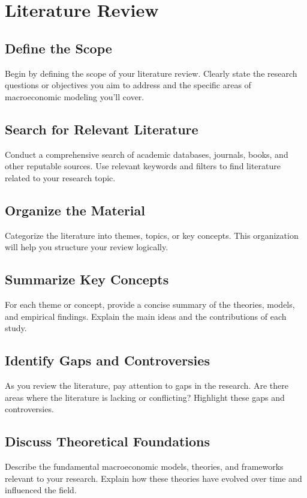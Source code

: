\documentclass[../thesis.tex]{subfiles}
\begin{document}
	
	\newpage
	
	\section{Literature Review}\label{sec:literature-review}
	
	\begin{tcolorbox}[colback=red!5!white,colframe=red!75!black]
		
	\subsection*{Define the Scope}
	Begin by defining the scope of your literature review. Clearly state the research questions or objectives you aim to address and the specific areas of macroeconomic modeling you'll cover.
	
	\subsection*{Search for Relevant Literature}
	Conduct a comprehensive search of academic databases, journals, books, and other reputable sources. Use relevant keywords and filters to find literature related to your research topic.
	
	\subsection*{Organize the Material}
	Categorize the literature into themes, topics, or key concepts. This organization will help you structure your review logically.
	
	\subsection*{Summarize Key Concepts}
	For each theme or concept, provide a concise summary of the theories, models, and empirical findings. Explain the main ideas and the contributions of each study.
	
	\subsection*{Identify Gaps and Controversies}
	As you review the literature, pay attention to gaps in the research. Are there areas where the literature is lacking or conflicting? Highlight these gaps and controversies.
	
	\subsection*{Discuss Theoretical Foundations}
	Describe the fundamental macroeconomic models, theories, and frameworks relevant to your research. Explain how these theories have evolved over time and influenced the field.
	
	\end{tcolorbox}
	
\end{document}
